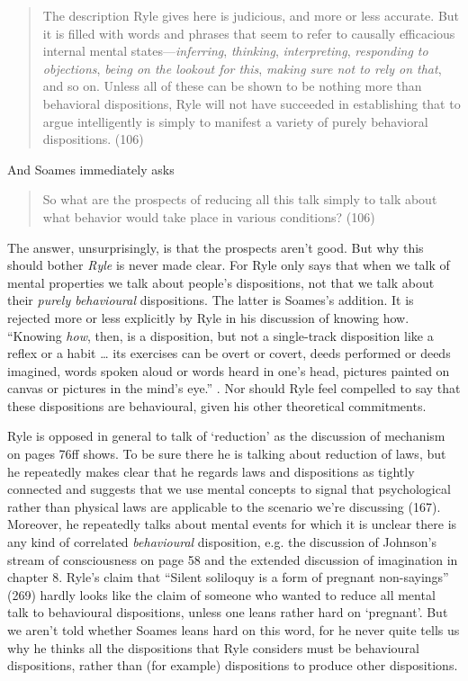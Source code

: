 \begin{quote}
The description Ryle gives here is judicious, and more or less accurate. But it is filled with words and phrases that seem to refer to causally efficacious internal mental states---\textit{inferring}, \textit{thinking}, \textit{interpreting}, \textit{responding to objections}, \textit{being on the lookout for this}, \textit{making sure not to rely on that}, and so on. Unless all of these can be shown to be nothing more than behavioral dispositions, Ryle will not have succeeded in establishing that to argue intelligently is simply to manifest a variety of purely behavioral dispositions. (106)
\end{quote}

\noindent And Soames immediately asks

\begin{quote}
So what are the prospects of reducing all this talk simply to talk about what behavior would take place in various conditions? (106)
\end{quote}


\noindent The answer, unsurprisingly, is that the prospects aren't good. But why this should bother \textit{Ryle} is never made clear. For Ryle only says that when we talk of mental properties we talk about people's dispositions, not that we talk about their \textit{purely behavioural} dispositions. The latter is Soames's addition. It is rejected more or less explicitly by Ryle in his discussion of knowing how. ``Knowing \textit{how}, then, is a disposition, but not a single-track disposition like a reflex or a habit {\dots} its exercises can be overt or covert, deeds performed or deeds imagined, words spoken aloud or words heard in one's head, pictures painted on canvas or  pictures in the mind's eye.'' \citeyearpar[46-47]{Ryle1949}. Nor should Ryle feel compelled to say that these dispositions are behavioural, given his other theoretical commitments.

Ryle is opposed in general to talk of `reduction' as the discussion of mechanism on pages 76ff shows. To be sure there he is talking about  reduction of laws, but he repeatedly makes clear that he regards laws and dispositions as tightly connected \citeyearpar[43, 123ff]{Ryle1949} and suggests that we use mental concepts to signal that psychological rather than physical laws are applicable to the scenario we're discussing (167). Moreover, he repeatedly talks about mental events for which it is unclear there is any kind of correlated \textit{behavioural} disposition, e.g. the discussion of Johnson's stream of consciousness on page 58 and the extended discussion of imagination in chapter 8. Ryle's claim that ``Silent soliloquy is a form of pregnant non-sayings'' (269) hardly looks like the claim of someone who wanted to reduce all mental talk to behavioural dispositions, unless one leans rather hard on `pregnant'. But we aren't told whether Soames leans hard on this word, for he never quite tells us why he thinks all the dispositions that Ryle considers must be behavioural dispositions, rather than (for example) dispositions to produce other dispositions.

